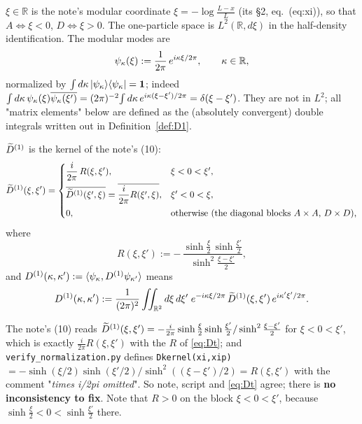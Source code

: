 \documentclass[11pt]{article}
\begin{document}
\begin{definition}\label{def:frame}
\(\xi\in\mathbb R\) is the note's modular coordinate \(\xi=-\log\frac{L-x}{L}\) (its \S2,
eq.~(eq:xi)), so that \(A\Leftrightarrow\xi<0\),
\(D\Leftrightarrow\xi>0\).  The one-particle space is \(L^2(\mathbb R,d\xi)\) in the half-density
identification.  The modular modes are
\begin{equation}\label{eq:psi}
 \psi_\kappa(\xi):=\frac{1}{2\pi}\,e^{i\kappa\xi/2\pi},\qquad\kappa\in\mathbb R ,
\end{equation}
normalized by \(\int d\kappa\,|\psi_\kappa\rangle\langle\psi_\kappa|=\mathbf 1\); indeed
\(\int d\kappa\,\psi_\kappa(\xi)\overline{\psi_\kappa(\xi')}
=(2\pi)^{-2}\!\int d\kappa\,e^{i\kappa(\xi-\xi')/2\pi}=\delta(\xi-\xi')\).
They are not in \(L^2\); all "matrix elements" below are defined as the (absolutely convergent)
double integrals written out in Definition~\ref{def:D1}.
\end{definition}

\begin{definition}\label{def:D1}
\(\widetilde D^{(1)}\) is the kernel of the note's (10):
\begin{equation}\label{eq:Dt}
 \widetilde D^{(1)}(\xi,\xi')=\begin{cases}
  \dfrac{i}{2\pi}\,R(\xi,\xi'), & \xi<0<\xi',\\[6pt]
  \overline{\widetilde D^{(1)}(\xi',\xi)}=\overline{\dfrac{i}{2\pi}R(\xi',\xi)}, & \xi'<0<\xi,\\[6pt]
  0,&\text{otherwise (the diagonal blocks \(A\times A\), \(D\times D\)),}\end{cases}
\end{equation}
where
\begin{equation}\label{eq:Rdef}
 R(\xi,\xi'):=-\,\frac{\sinh\frac\xi2\,\sinh\frac{\xi'}2}{\sinh^2\frac{\xi-\xi'}2},
\end{equation}
and \(D^{(1)}(\kappa,\kappa'):=\langle\psi_\kappa,D^{(1)}\psi_{\kappa'}\rangle\) means
\begin{equation}\label{eq:matrixelt}
 D^{(1)}(\kappa,\kappa')
 :=\frac{1}{(2\pi)^2}\iint_{\mathbb R^2} d\xi\,d\xi'\;e^{-i\kappa\xi/2\pi}\,\widetilde D^{(1)}(\xi,\xi')\,e^{i\kappa'\xi'/2\pi}.
\end{equation}
\end{definition}

\begin{remark}\label{rem:consistency}
The note's (10) reads \(\widetilde D^{(1)}(\xi,\xi')=-\frac{i}{2\pi}\sinh\frac\xi2\sinh\frac{\xi'}2/
\sinh^2\frac{\xi-\xi'}2\) for \(\xi<0<\xi'\), which is exactly \(\frac i{2\pi}R(\xi,\xi')\) with the
\(R\) of \eqref{eq:Dt}; and \texttt{verify\_normalization.py} defines
\texttt{Dkernel(xi,xip)}\(=-\sinh(\xi/2)\sinh(\xi'/2)/\sinh^2((\xi-\xi')/2)=R(\xi,\xi')\) with the
comment "\emph{times i/2pi omitted}".  So note, script and \eqref{eq:Dt} agree; there is
\textbf{no inconsistency to fix}.  Note that \(R>0\) on the block \(\xi<0<\xi'\), because
\(\sinh\frac\xi2<0<\sinh\frac{\xi'}2\) there.
\end{remark}
\end{document}
